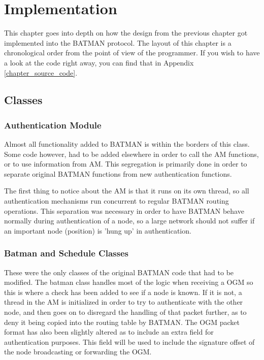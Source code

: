 \chapter{Implementation}\label{chapter_implementation}

This chapter goes into depth on how the design from the previous chapter got
implemented into the BATMAN protocol. The layout of this chapter is a
chronological order from the point of view of the programmer. If you wish to
have a look at the code right away, you can find that in Appendix
\ref{chapter_source_code}.


\section{Classes}

\subsection{Authentication Module}
Almost all functionality added to BATMAN is within the borders of this class.
Some code however, had to be added elsewhere in order to call the \ac{AM}
functions, or to use information from \ac{AM}. This segregation is primarily
done in order to separate original BATMAN functions from new authentication
functions.

The first thing to notice about the \ac{AM} is that it runs on its own thread,
so all authentication mechanisms run concurrent to regular BATMAN routing
operations. This separation was necessary in order to have BATMAN behave
normally during authentication of a node, so a large network should not suffer
if an important node (position) is 'hung up' in authentication.

\subsection{Batman and Schedule Classes}
These were the only classes of the original BATMAN code that had to be modified.
The batman class handles most of the logic when receiving a \ac{OGM} so this is
where a check has been added to see if a node is known. If it is not, a thread
in the \ac{AM} is initialized in order to try to authenticate with the other
node, and then goes on to disregard the handling of that packet further, as to
deny it being copied into the routing table by BATMAN. The \ac{OGM} packet
format has also been slightly altered as to include an extra field for
authentication purposes. This field will be used to include the signature offset
of the node broadcasting or forwarding the \ac{OGM}.

